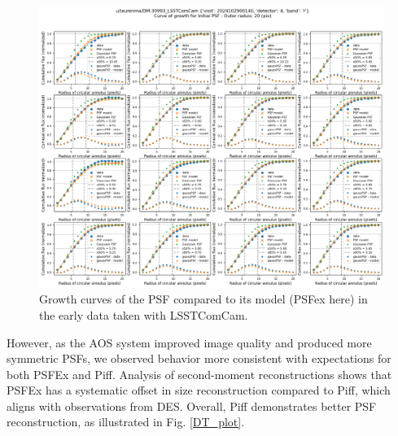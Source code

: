 \begin{figure}
        \centering
        \includegraphics[scale=0.2]{figures/curveOfGrowth_pfsex_u_laurenma_DM-30993_LSSTComCam_2024102900140_4}
        \caption{\small Growth curves of the PSF compared to its model (PSFex here)  in the early data taken with LSSTComCam. }
        \label{growth_plot}
\end{figure}



However, as the AOS system improved image quality and produced more symmetric PSFs, we observed behavior more consistent with expectations for both PSFEx and Piff. 
Analysis of second-moment reconstructions shows that PSFEx has a systematic offset in size reconstruction compared to Piff, which aligns with observations from DES. Overall, Piff demonstrates better PSF reconstruction, as illustrated in Fig. \ref{DT_plot}. 

